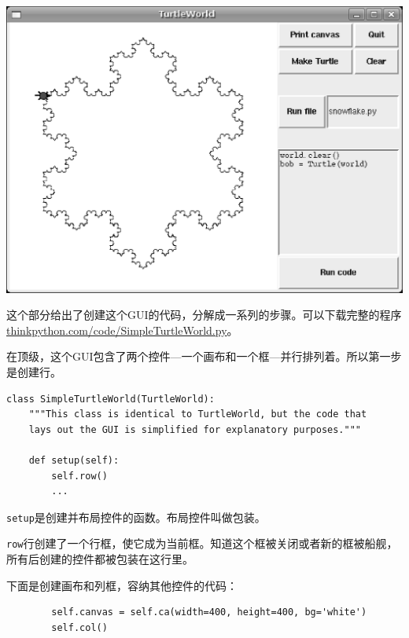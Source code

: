 \beforefig
\centerline{
\includegraphics[width=1.0\textwidth]{figs/TurtleWorld.eps}
}
\afterfig


这个部分给出了创建这个GUI的代码，分解成一系列的步骤。可以下载完整的程序 \url{thinkpython.com/code/SimpleTurtleWorld.py}。

在顶级，这个GUI包含了两个控件---一个画布和一个框---并行排列着。所以第一步是创建行。


\beforeverb
\begin{verbatim}
class SimpleTurtleWorld(TurtleWorld):
    """This class is identical to TurtleWorld, but the code that
    lays out the GUI is simplified for explanatory purposes."""

    def setup(self):
        self.row()
        ...
\end{verbatim}
\afterverb
%

{\tt setup}是创建并布局控件的函数。布局控件叫做包装。


{\tt row}行创建了一个行框，使它成为当前框。知道这个框被关闭或者新的框被船舰，所有后创建的控件都被包装在这行里。

下面是创建画布和列框，容纳其他控件的代码：

\beforeverb
\begin{verbatim}
        self.canvas = self.ca(width=400, height=400, bg='white')
        self.col()
\end{verbatim}
\afterverb
%

